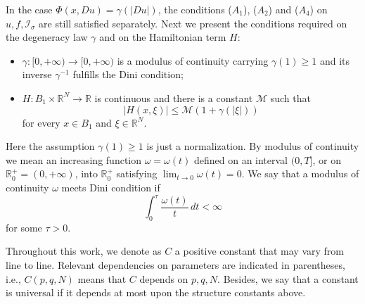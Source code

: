 \documentclass[11pt,reqno]{amsart}
\numberwithin{equation}{section}
\begin{document}
In the case $\Phi(x,Du)=\gamma(|Du|)$, the conditions ($A_1$), ($A_2$) and ($A_4$) on $u,f,\mathcal{I}_\sigma$ are still satisfied separately.
Next we present the conditions required on the degeneracy law $\gamma$ and on the Hamiltonian term $H$:
\begin{itemize}
\item[($A_5$)] $\gamma:[0,+\infty)\rightarrow[0,+\infty)$ is a modulus of continuity carrying $\gamma(1)\ge1$ and its inverse $\gamma^{-1}$ fulfills the Dini condition;
\item[($A_6$)] $H:B_1\times \mathbb{R}^N\rightarrow \mathbb{R}$ is continuous and there is a constant $\mathcal{M}$ such that
    \begin{equation}
    \label{5-1}
    |H(x,\xi)|\le \mathcal{M}(1+\gamma(|\xi|))
    \end{equation}
    for every $x\in B_1$ and $\xi\in \mathbb{R}^N$.
\end{itemize}

Here the assumption $\gamma(1)\ge1$ is just a normalization. By modulus of continuity we mean an increasing function $\omega=\omega(t)$ defined on an interval $(0,T]$, or on $\mathbb{R}^+_0=(0,+\infty)$, into $\mathbb{R}^+_0$ satisfying $\lim_{t\rightarrow0}\omega(t)=0$. We say that a modulus of continuity $\omega$ meets Dini condition if
\begin{equation*}
\int^\tau_0\frac{\omega(t)}{t}\,dt<\infty
\end{equation*}
for some $\tau>0$.

Throughout this work, we denote as $C$ a positive constant that may vary from line to line. Relevant dependencies on parameters are indicated in parentheses, i.e., $C(p,q,N)$ means that $C$ depends on $p,q,N$. Besides, we say that a constant is universal if it depends at most upon the structure constants above. %
\end{document}
